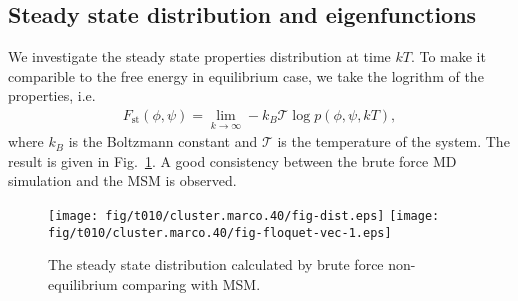 \documentclass[aps, pre, preprint,unsortedaddress,a4paper,onecolumn]{revtex4}
\begin{document}



\subsection{Steady state distribution and eigenfunctions}
We investigate the steady state properties distribution at time $kT$. To make it comparible to
the free energy in equilibrium case, we take the logrithm of the properties, i.e.
\begin{align}
  \label{eq:num-tmp1}
  F_{\textrm{st}}(\phi,\psi) = \lim_{k\rightarrow\infty} -k_B\mathcal T \log p(\phi,\psi,kT),
\end{align}
where $k_B$ is the Boltzmann constant and $\mathcal T$ is the temperature of the system.
The result is given in Fig.~\ref{fig:num-1}. A good consistency between the brute force
MD simulation and the MSM is observed.

\begin{figure}
  \centering  
  \texttt{[image: fig/t010/cluster.marco.40/fig-dist.eps]}
  \texttt{[image: fig/t010/cluster.marco.40/fig-floquet-vec-1.eps]}
  \caption{The steady state distribution calculated by brute force non-equilibrium comparing with MSM.}
  \label{fig:num-1}
\end{figure}


\end{document}
